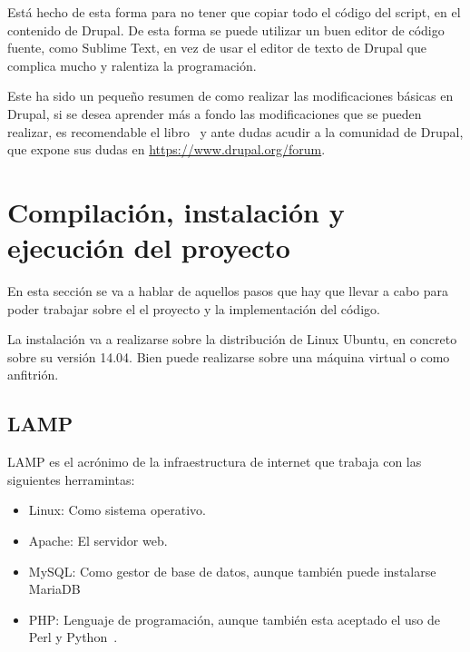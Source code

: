 Está hecho de esta forma para no tener que copiar todo el código del script, en el contenido de Drupal. De esta forma se puede utilizar un buen editor de código fuente, como Sublime Text, en vez de usar el editor de texto de Drupal que complica mucho y ralentiza la programación.

Este ha sido un pequeño resumen de como realizar las modificaciones básicas en Drupal, si se desea aprender más a fondo las modificaciones que se pueden realizar, es recomendable el libro~\cite{tomlinson2010pro} y ante dudas acudir a la comunidad de Drupal, que expone sus dudas en \url{https://www.drupal.org/forum}.

\section{Compilación, instalación y ejecución del proyecto}
En esta sección se va a hablar de aquellos pasos que hay que llevar a cabo para poder trabajar sobre el el proyecto y la implementación del código.

La instalación va a realizarse sobre la distribución de Linux Ubuntu, en concreto sobre su versión 14.04. Bien puede realizarse sobre una máquina virtual o como anfitrión.
\subsection{LAMP}
LAMP es el acrónimo de la infraestructura de internet que trabaja con las siguientes herramintas:
\begin{itemize}
\item Linux: Como sistema operativo.
\item Apache: El servidor web.
\item MySQL: Como gestor de base de datos, aunque también puede instalarse MariaDB
\item PHP: Lenguaje de programación,  aunque también esta aceptado el uso de Perl y Python~\cite{wiki:lamp}.
\end{itemize}
